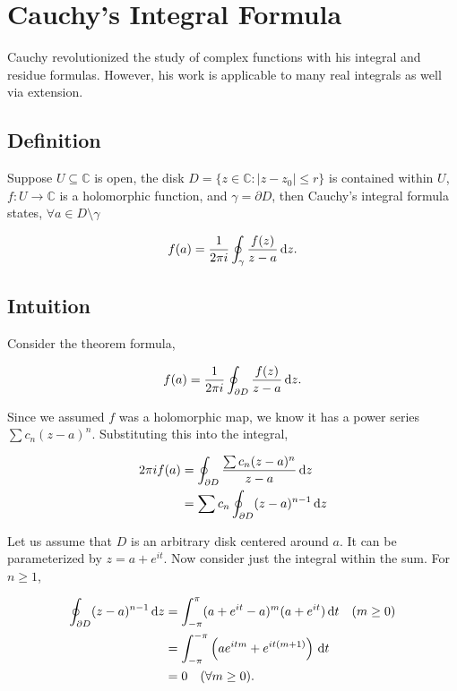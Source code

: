 \section{Cauchy's Integral Formula} \label{sec:Cauchy}
Cauchy revolutionized the study of complex functions with his integral and residue formulas. However, his work is applicable to many real integrals as well via extension.

\subsection*{Definition}
Suppose $U\subseteq \mathbb C$ is open, the disk $D=\{z\in \mathbb C : |z-z_0|\le r\}$ is contained within $U$, $f:U\to \mathbb C$ is a holomorphic function, and $\gamma=\partial D$, then Cauchy's integral formula states, $\forall a \in D\setminus \gamma$

$$ f(a) = \frac{1}{2\pi i}\oint_\gamma \frac{f(z)}{z-a}\,\textrm{d}z. $$


\subsection*{Intuition}

Consider the theorem formula,

$$ f(a) = \frac{1}{2\pi i} \oint_{\partial D} \frac{f(z)}{z-a}\,\textrm{d}z. $$

Since we assumed $f$ was a holomorphic map, we know it has a power series $\sum c_n(z-a)^n$. Substituting this into the integral,

\begin{align*}
    2\pi i f(a) &= \oint_{\partial D} \frac{\sum c_n(z-a)^n}{z-a}\,\textrm{d}z \\
    &= \sum c_n \oint_{\partial D} (z-a)^{n-1}\,\textrm{d}z \\
\end{align*}

Let us assume that $D$ is an arbitrary disk centered around $a$. It can be parameterized by $z = a + e^{it}$. Now consider just the integral within the sum. For $n \ge 1$,

\begin{align*}
    \oint_{\partial D} (z-a)^{n-1}\,\textrm{d}z &= \int_{-\pi}^{\pi} (a+e^{it}-a)^{m} (a+e^{it})\,\textrm{d}t \quad (m \ge 0) \\
    &= \int_{-\pi}^{-\pi} \left(ae^{itm} + e^{it(m+1)}\right)\,\textrm{d}t \\
    &= 0 \quad (\forall m\ge 0).
\end{align*}

